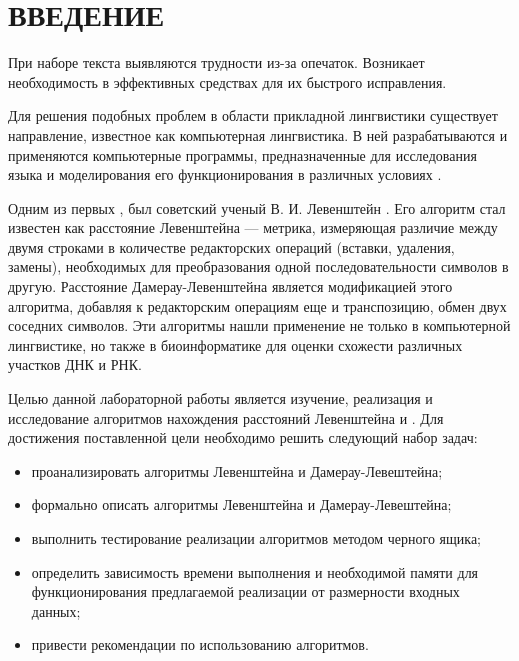 \part*{ВВЕДЕНИЕ}

При наборе текста выявляются трудности из-за опечаток. Возникает необходимость в эффективных средствах для их быстрого исправления.

Для решения подобных проблем в области прикладной лингвистики существует направление, известное как компьютерная лингвистика. В ней разрабатываются и применяются компьютерные программы, предназначенные для исследования языка и моделирования его функционирования в различных условиях \cite{big_comp_lingua}.

Одним из первых , был советский ученый В. И. Левенштейн \cite{levenstein}. Его алгоритм стал известен как расстояние Левенштейна — метрика, измеряющая различие между двумя строками в количестве редакторских операций (вставки, удаления, замены), необходимых для преобразования одной последовательности символов в другую. Расстояние Дамерау-Левенштейна является модификацией этого алгоритма, добавляя к редакторским операциям еще и транспозицию, обмен двух соседних символов. Эти алгоритмы нашли применение не только в компьютерной лингвистике, но также в биоинформатике для оценки схожести различных участков ДНК и РНК.

Целью данной лабораторной работы является изучение, реализация и исследование алгоритмов нахождения расстояний Левенштейна и . Для достижения поставленной цели необходимо решить следующий набор задач:

\begin{itemize}
	\item проанализировать алгоритмы Левенштейна и Дамерау-Левештейна;
	\item формально описать алгоритмы Левенштейна и Дамерау-Левештейна;
	\item выполнить тестирование реализации алгоритмов методом черного ящика;
	\item определить зависимость времени выполнения и необходимой памяти для функционирования предлагаемой реализации от размерности входных данных;
	\item привести рекомендации по использованию алгоритмов.
\end{itemize}